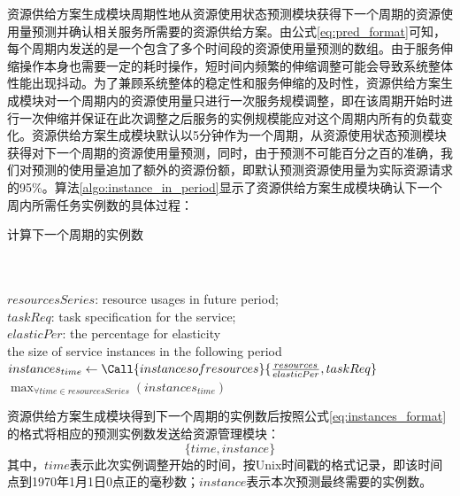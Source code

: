 资源供给方案生成模块周期性地从资源使用状态预测模块获得下一个周期的资源使用量预测并确认相关服务所需要的资源供给方案。由公式\ref{eq:pred_format}可知，每个周期内发送的是一个包含了多个时间段的资源使用量预测的数组。由于服务伸缩操作本身也需要一定的耗时操作，短时间内频繁的伸缩调整可能会导致系统整体性能出现抖动。为了兼顾系统整体的稳定性和服务伸缩的及时性，资源供给方案生成模块对一个周期内的资源使用量只进行一次服务规模调整，即在该周期开始时进行一次伸缩并保证在此次调整之后服务的实例规模能应对这个周期内所有的负载变化。资源供给方案生成模块默认以5分钟作为一个周期，从资源使用状态预测模块获得对下一个周期的资源使用量预测，同时，由于预测不可能百分之百的准确，我们对预测的使用量追加了额外的资源份额，即默认预测资源使用量为实际资源请求的95\%。算法\ref{algo:instance_in_period}显示了资源供给方案生成模块确认下一个周内所需任务实例数的具体过程：
\begin{algorithm}[H]
\caption{计算下一个周期的实例数}
\label{algo:instance_in_period}
\begin{algorithmic}[0]
\\
\Require ~~\
\\
$resourcesSeries$: resource usages in future period;\\
$taskReq$: task specification for the service;\\
$elasticPer$: the percentage for elasticity
\Ensure ~~\
\\
the size of service instances in the following period\\

    \State $instances_{time} \gets \Call{instancesofresources}{\frac{resources}{elasticPer}, {taskReq}}$
\EndFor
\State \Return $\max_{\forall time \in resourcesSeries} {(instances_{time})}$
\end{algorithmic}
\end{algorithm}

资源供给方案生成模块得到下一个周期的实例数后按照公式\ref{eq:instances_format}的格式将相应的预测实例数发送给资源管理模块：
\begin{equation}\label{eq:instances_format}
\{time, instance\}
\end{equation}
其中，$time$表示此次实例调整开始的时间，按Unix时间戳的格式记录，即该时间点到1970年1月1日0点正的毫秒数；$instance$表示本次预测最终需要的实例数。

